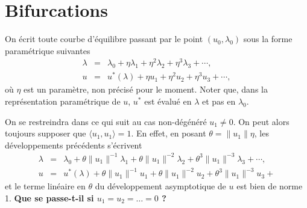 \documentclass{article}
\newcommand{\tmstrong}[1]{\textbf{#1}}
\newcommand{\nonconverted}[1]{\mbox{}}
\begin{document}
\section{Bifurcations}

On {\'e}crit toute courbe d'{\'e}quilibre passant par le point $(u_0,
\lambda_0)$ sous la forme param{\'e}trique suivantes
\begin{eqnarray}
  \lambda & = & \lambda_0 + \eta \lambda_1 + \eta^2 \lambda_2 + \eta^3
  \lambda_3 + \cdots,  \label{eq20211115075817}\\
  u & = & u^{\ast} (\lambda) + \eta u_1 + \eta^2 u_2 + \eta^3 u_3 + \cdots,
  \label{eq20211115075835}
\end{eqnarray}
o{\`u} $\eta$ est un param{\`e}tre, non pr{\'e}cis{\'e} pour le moment. Noter
que, dans la repr{\'e}sentation param{\'e}trique de $u$, $u^{\ast}$ est
{\'e}valu{\'e} en $\lambda$ et pas en $\lambda_0$.

On se restreindra dans ce qui suit au cas non-d{\'e}g{\'e}n{\'e}r{\'e} $u_1
\neq 0$. On peut alors toujours supposer que $\langle u_1, u_1 \rangle = 1$.
En effet, en posant $\theta = \lVert u_1 \rVert \eta$, les d{\'e}veloppements
pr{\'e}c{\'e}dents s'{\'e}crivent
\begin{eqnarray}
  \lambda & = & \lambda_0 + \theta \lVert u_1 \rVert^{- 1} \lambda_1 + \theta
  \nonconverted{twosuperior} \lVert u_1 \rVert^{- 2} \lambda_2 + \theta^3
  \lVert u_1 \rVert^{- 3} \lambda_3 + \cdots, \\
  u & = & u^{\ast} (\lambda) + \theta \lVert u_1 \rVert^{- 1} u_1 + \theta
  \nonconverted{twosuperior} \lVert u_1 \rVert^{- 2} u_2 + \theta^3 \lVert u_1
  \rVert^{- 3} u_3 +
\end{eqnarray}
et le terme lin{\'e}aire en $\theta$ du d{\'e}veloppement asymptotique de $u$
est bien de norme 1. {\tmstrong{Que se passe-t-il si $u_1 = u_2 = \ldots = 0$
?}}
\end{document}
